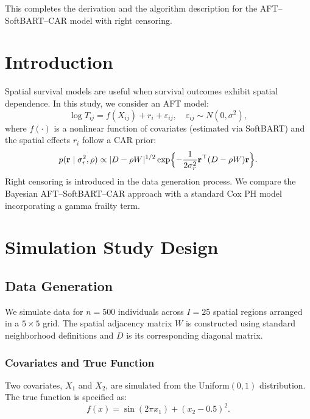 \documentclass[useAMS,referee]{biom}
\begin{document}
This completes the derivation and the algorithm description for the AFT--SoftBART--CAR model with right censoring.
























\section{Introduction}
Spatial survival models are useful when survival outcomes exhibit spatial dependence. In this study, we consider an AFT model:
\[
\log T_{ij} = f(X_{ij}) + r_i + \varepsilon_{ij}, \quad \varepsilon_{ij} \sim N(0,\sigma^2),
\]
where $f(\cdot)$ is a nonlinear function of covariates (estimated via SoftBART) and the spatial effects $r_i$ follow a CAR prior:
\[
p(\mathbf{r} \mid \sigma_r^2, \rho) \propto |D - \rho W|^{1/2} \exp\Bigl\{-\frac{1}{2\sigma_r^2} \mathbf{r}^\top (D-\rho W) \mathbf{r}\Bigr\}.
\]
Right censoring is introduced in the data generation process. We compare the Bayesian AFT--SoftBART--CAR approach with a standard Cox PH model incorporating a gamma frailty term.

\section{Simulation Study Design}

\subsection{Data Generation}
We simulate data for $n=500$ individuals across $I=25$ spatial regions arranged in a $5 \times 5$ grid. The spatial adjacency matrix $W$ is constructed using standard neighborhood definitions and $D$ is its corresponding diagonal matrix.

\subsubsection{Covariates and True Function}
Two covariates, $X_1$ and $X_2$, are simulated from the Uniform$(0,1)$ distribution. The true function is specified as:
\[
f(x) = \sin(2\pi x_1) + (x_2-0.5)^2.
\]
\end{document}
